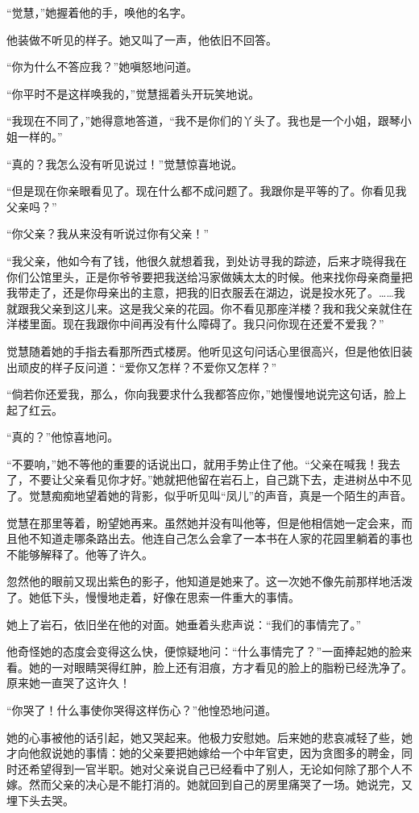 \par “觉慧，”她握着他的手，唤他的名字。
\par 他装做不听见的样子。她又叫了一声，他依旧不回答。
\par “你为什么不答应我？”她嗔怒地问道。
\par “你平时不是这样唤我的，”觉慧摇着头开玩笑地说。
\par “我现在不同了，”她得意地答道，“我不是你们的丫头了。我也是一个小姐，跟琴小姐一样的。”
\par “真的？我怎么没有听见说过！”觉慧惊喜地说。
\par “但是现在你亲眼看见了。现在什么都不成问题了。我跟你是平等的了。你看见我父亲吗？”
\par “你父亲？我从来没有听说过你有父亲！”
\par “我父亲，他如今有了钱，他很久就想着我，到处访寻我的踪迹，后来才晓得我在你们公馆里头，正是你爷爷要把我送给冯家做姨太太的时候。他来找你母亲商量把我带走了，还是你母亲出的主意，把我的旧衣服丢在湖边，说是投水死了。……我就跟我父亲到这儿来。这是我父亲的花园。你不看见那座洋楼？我和我父亲就住在洋楼里面。现在我跟你中间再没有什么障碍了。我只问你现在还爱不爱我？”
\par 觉慧随着她的手指去看那所西式楼房。他听见这句问话心里很高兴，但是他依旧装出顽皮的样子反问道：“爱你又怎样？不爱你又怎样？”
\par “倘若你还爱我，那么，你向我要求什么我都答应你，”她慢慢地说完这句话，脸上起了红云。
\par “真的？”他惊喜地问。
\par “不要响，”她不等他的重要的话说出口，就用手势止住了他。“父亲在喊我！我去了，不要让父亲看见你才好。”她就把他留在岩石上，自己跳下去，走进树丛中不见了。觉慧痴痴地望着她的背影，似乎听见叫“凤儿”的声音，真是一个陌生的声音。
\par 觉慧在那里等着，盼望她再来。虽然她并没有叫他等，但是他相信她一定会来，而且他不知道走哪条路出去。他连自己怎么会拿了一本书在人家的花园里躺着的事也不能够解释了。他等了许久。
\par 忽然他的眼前又现出紫色的影子，他知道是她来了。这一次她不像先前那样地活泼了。她低下头，慢慢地走着，好像在思索一件重大的事情。
\par 她上了岩石，依旧坐在他的对面。她垂着头悲声说：“我们的事情完了。”
\par 他奇怪她的态度会变得这么快，便惊疑地问：“什么事情完了？”一面捧起她的脸来看。她的一对眼睛哭得红肿，脸上还有泪痕，方才看见的脸上的脂粉已经洗净了。原来她一直哭了这许久！
\par “你哭了！什么事使你哭得这样伤心？”他惶恐地问道。
\par 她的心事被他的话引起，她又哭起来。他极力安慰她。后来她的悲哀减轻了些，她才向他叙说她的事情：她的父亲要把她嫁给一个中年官吏，因为贪图多的聘金，同时还希望得到一官半职。她对父亲说自己已经看中了别人，无论如何除了那个人不嫁。然而父亲的决心是不能打消的。她就回到自己的房里痛哭了一场。她说完，又埋下头去哭。
